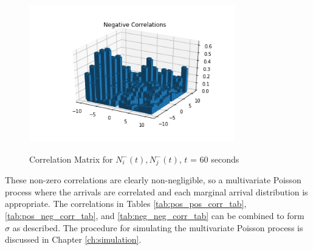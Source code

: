 \begin{figure}[t]
\begin{center}
\label{fig:neg_neg_corr_pic}
\includegraphics[width=0.8\textwidth]{LaTeX/Figures/neg_neg_correlations.png}
\caption{Correlation Matrix for $N^{-}_i(t), N^{-}_j(t)$, $t$ = 60 seconds}
\end{center}
\end{figure}

These non-zero correlations are clearly non-negligible, so a multivariate Poisson process where the arrivals are correlated and each marginal arrival distribution is appropriate. The correlations in Tables \ref{tab:pos_pos_corr_tab}, \ref{tab:pos_neg_corr_tab}, and \ref{tab:neg_neg_corr_tab} can be combined to form $\sigma$ as described. The procedure for simulating the multivariate Poisson process is discussed in Chapter \ref{ch:simulation}.
